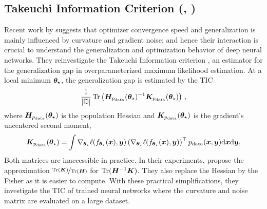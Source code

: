 \subsection{Takeuchi Information Criterion (,
  )}\label{cockpit::app:tic}

Recent work by \citet{thomas2020interplay} suggests that optimizer convergence
speed and generalization is mainly influenced by curvature and gradient noise;
and hence their interaction is crucial to understand the generalization and
optimization behavior of deep neural networks. They reinvestigate the Takeuchi
Information criterion \citep{takeuchi1976distribution}, an estimator for the
generalization gap in overparameterized maximum likelihood estimation. At a
local minimum ${\bm{\theta}}_\star$, the generalization gap is estimated by the TIC
\begin{equation}
  \label{cockpit::eq:tic-theory}
  \frac{1}{|{\mathbb{D}}|}
  \operatorname{Tr}
  \left(
    {\bm{H}}_{p_{\mathrm{data}}}({\bm{\theta}}_\star)^{-1}
    {\bm{K}}_{p_{\mathrm{data}}}({\bm{\theta}}_\star)
  \right)\,,
\end{equation}
where ${\bm{H}}_{p_{\mathrm{data}}}({\bm{\theta}}_\star)$ is the population Hessian and
${\bm{K}}_{p_{\mathrm{data}}}({\bm{\theta}}_\star)$ is the gradient's uncentered second moment,
\begin{equation*}
  {\bm{K}}_{p_{\mathrm{data}}}({\bm{\theta}}_\star)
  = \int
  \nabla_{{\bm{\theta}}_{\star}}\ell(f_{{\bm{\theta}}_{\star}}( {\bm{x}}), {\bm{y}})
  \left(
    \nabla_{{\bm{\theta}}_{\star}}\ell(f_{{\bm{\theta}}_{\star}}( {\bm{x}}), {\bm{y}})
  \right)^\top p_{\mathrm{data}}({\bm{x}}, {\bm{y}})
  \mathrm{d}{\bm{x}}\mathrm{d}{\bm{y}}.
\end{equation*}
Both matrices are inaccessible in practice. In their experiments,
\citet{thomas2020interplay} propose the approximation
$\nicefrac{\operatorname{Tr}({\bm{K}})}{\operatorname{Tr}({\bm{H}})}$ for $\operatorname{Tr}({\bm{H}}^{-1} {\bm{K}})$. They also replace the
Hessian by the Fisher as it is easier to compute. With these practical
simplifications, they investigate the TIC of trained neural networks where the
curvature and noise matrix are evaluated on a large dataset.

